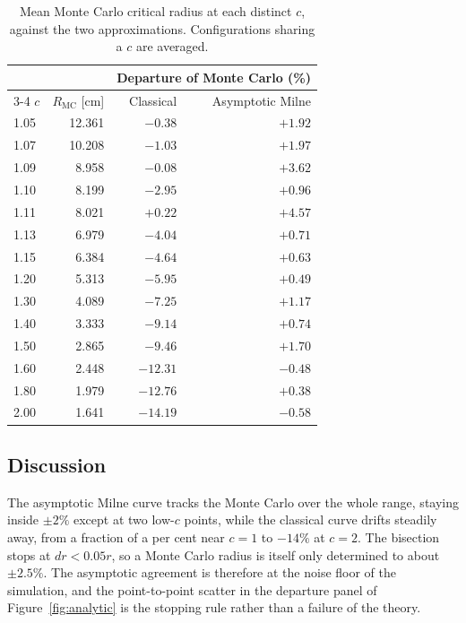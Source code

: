 \documentclass[11pt]{article}
\begin{document}
\begin{table}[hbt!]
    \centering
    \begin{tabular}{lrrr}
        \toprule
        & & \multicolumn{2}{c}{Departure of Monte Carlo (\%)} \\
        \cmidrule(lr){3-4}
        $c$ & $R_{\text{MC}}$ [cm] & Classical & Asymptotic Milne \\
        \midrule
        1.05 & 12.361 & $-0.38$ & $+1.92$ \\
        1.07 & 10.208 & $-1.03$ & $+1.97$ \\
        1.09 &  8.958 & $-0.08$ & $+3.62$ \\
        1.10 &  8.199 & $-2.95$ & $+0.96$ \\
        1.11 &  8.021 & $+0.22$ & $+4.57$ \\
        1.13 &  6.979 & $-4.04$ & $+0.71$ \\
        1.15 &  6.384 & $-4.64$ & $+0.63$ \\
        1.20 &  5.313 & $-5.95$ & $+0.49$ \\
        1.30 &  4.089 & $-7.25$ & $+1.17$ \\
        1.40 &  3.333 & $-9.14$ & $+0.74$ \\
        1.50 &  2.865 & $-9.46$ & $+1.70$ \\
        1.60 &  2.448 & $-12.31$ & $-0.48$ \\
        1.80 &  1.979 & $-12.76$ & $+0.38$ \\
        2.00 &  1.641 & $-14.19$ & $-0.58$ \\
        \bottomrule
    \end{tabular}
    \caption{Mean Monte Carlo critical radius at each distinct $c$, against the two
    approximations. Configurations sharing a $c$ are averaged.}
    \label{tab:analytic}
\end{table}


\subsection*{Discussion}

The asymptotic Milne curve tracks the Monte Carlo over the whole range, staying inside $\pm 2\%$
except at two low-$c$ points, while the classical curve drifts steadily away, from a fraction of a
per cent near $c = 1$ to $-14\%$ at $c = 2$. The bisection stops at $dr < 0.05r$, so a Monte Carlo
radius is itself only determined to about $\pm 2.5\%$. The asymptotic agreement is therefore at
the noise floor of the simulation, and the point-to-point scatter in the departure panel of
Figure~\ref{fig:analytic} is the stopping rule rather than a failure of the theory.
\end{document}

